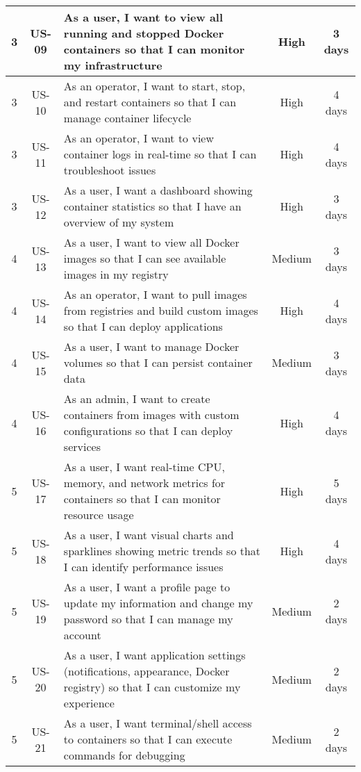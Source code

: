 \begin{longtable}{|c|c|p{7cm}|c|c|}
3 & US-09 & As a user, I want to view all running and stopped Docker containers so that I can monitor my infrastructure & High & 3 days \\ \hline
3 & US-10 & As an operator, I want to start, stop, and restart containers so that I can manage container lifecycle & High & 4 days \\ \hline
3 & US-11 & As an operator, I want to view container logs in real-time so that I can troubleshoot issues & High & 4 days \\ \hline
3 & US-12 & As a user, I want a dashboard showing container statistics so that I have an overview of my system & High & 3 days \\ \hline

4 & US-13 & As a user, I want to view all Docker images so that I can see available images in my registry & Medium & 3 days \\ \hline
4 & US-14 & As an operator, I want to pull images from registries and build custom images so that I can deploy applications & High & 4 days \\ \hline
4 & US-15 & As a user, I want to manage Docker volumes so that I can persist container data & Medium & 3 days \\ \hline
4 & US-16 & As an admin, I want to create containers from images with custom configurations so that I can deploy services & High & 4 days \\ \hline

5 & US-17 & As a user, I want real-time CPU, memory, and network metrics for containers so that I can monitor resource usage & High & 5 days \\ \hline
5 & US-18 & As a user, I want visual charts and sparklines showing metric trends so that I can identify performance issues & High & 4 days \\ \hline
5 & US-19 & As a user, I want a profile page to update my information and change my password so that I can manage my account & Medium & 2 days \\ \hline
5 & US-20 & As a user, I want application settings (notifications, appearance, Docker registry) so that I can customize my experience & Medium & 2 days \\ \hline
5 & US-21 & As a user, I want terminal/shell access to containers so that I can execute commands for debugging & Medium & 2 days \\ \hline


\end{longtable}
